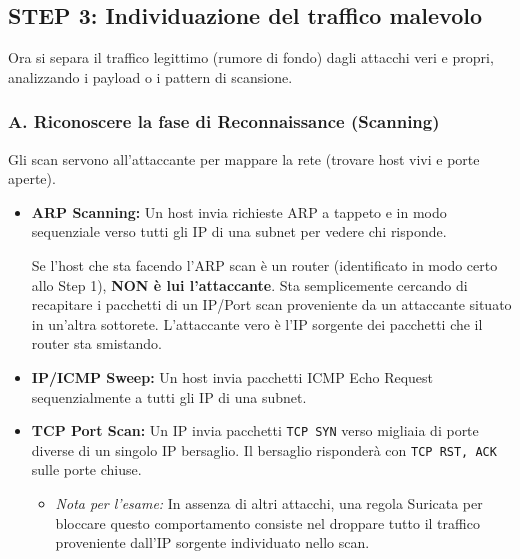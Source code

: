 \documentclass[12pt,a4paper]{report}
\begin{document}
	\subsection{STEP 3: Individuazione del traffico malevolo\textbf{}}
	Ora si separa il traffico legittimo (rumore di fondo) dagli attacchi veri e propri, analizzando i payload o i pattern di scansione.
	
	\subsubsection{A. Riconoscere la fase di Reconnaissance (Scanning)}
	Gli scan servono all'attaccante per mappare la rete (trovare host vivi e porte aperte).
	\begin{itemize}
		\item \textbf{ARP Scanning:} Un host invia richieste ARP a tappeto e in modo sequenziale verso tutti gli IP di una subnet per vedere chi risponde.
		\begin{nota}
			Se l'host che sta facendo l'ARP scan è un router (identificato in modo certo allo Step 1), \textbf{NON è lui l'attaccante}. Sta semplicemente cercando di recapitare i pacchetti di un IP/Port scan proveniente da un attaccante situato in un'altra sottorete. L'attaccante vero è l'IP sorgente dei pacchetti che il router sta smistando.
		\end{nota}
		\item \textbf{IP/ICMP Sweep:} Un host invia pacchetti ICMP Echo Request sequenzialmente a tutti gli IP di una subnet.
		\item \textbf{TCP Port Scan:} Un IP invia pacchetti \texttt{TCP SYN} verso migliaia di porte diverse di un singolo IP bersaglio. Il bersaglio risponderà con \texttt{TCP RST, ACK} sulle porte chiuse.
		\begin{itemize}
			\item \textit{Nota per l'esame:} In assenza di altri attacchi, una regola Suricata per bloccare questo comportamento consiste nel droppare tutto il traffico proveniente dall'IP sorgente individuato nello scan.
		\end{itemize}
	\end{itemize}
	
\end{document}
